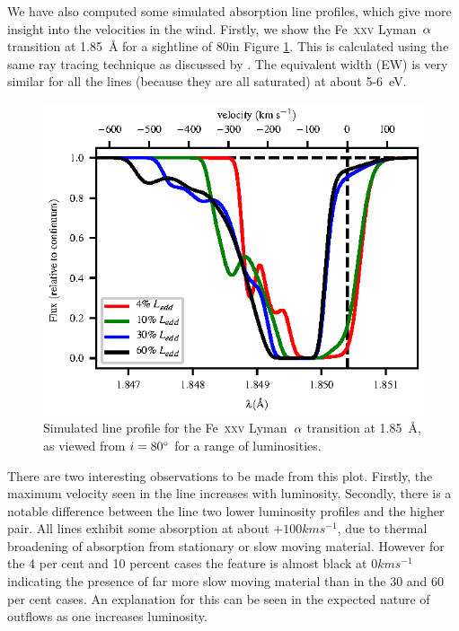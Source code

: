 \documentclass[a4paper,fleqn,usenatbib]{mnras}
\begin{document}
We have also computed some simulated absorption line profiles, which give more insight into the velocities 
in the wind.
Firstly, we show the Fe~\textsc{xxv} Lyman~$\rm{\alpha}$ transition at 1.85~{\AA} for a sightline 
of 80\degree in Figure \ref{figure:line25}. This is calculated using the same ray tracing technique as discussed 
by \cite{2015ApJ...807..107H}. The equivalent width (EW) is very similar for all the lines (because they are all 
saturated) at about 5-6~eV. 

\begin{figure}
\includegraphics[width=\columnwidth]{figures/80_degrees_fe25.eps}
\caption{Simulated line profile for the Fe~\textsc{xxv} Lyman~$\rm{\alpha}$
transition at 1.85~{\AA}, as viewed from $i = 80\degree$ for a range
of luminosities.}
\label{figure:line25}
\end{figure}

There are two interesting observations to be made from this plot. Firstly, the maximum velocity seen in 
the line increases with luminosity. Secondly, there is a notable difference between the line two lower luminosity 
profiles and the higher pair. All lines exhibit some absorption at about $+100kms^{-1}$, due to thermal 
broadening of absorption from stationary or slow moving material. However for the 4 per cent and 10 percent 
cases the feature is almost black at $0kms^{-1}$ indicating the presence of far more slow moving material than 
in the 30 and 60 per cent cases. An explanation for this can be seen in the expected nature of outflows as one 
increases luminosity. 
\end{document}
